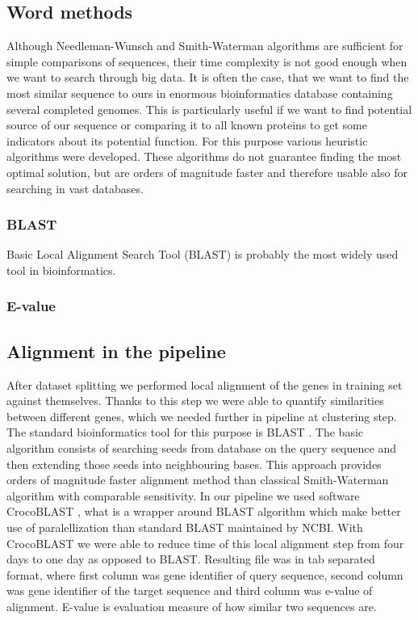 \subsection{Word methods}
Although Needleman-Wunsch and Smith-Waterman algorithms are sufficient for simple comparisons of sequences, their time complexity is not good enough when we want to search through big data.
It is often the case, that we want to find the most similar sequence to ours in enormous bioinformatics database containing several completed genomes.
This is particularly useful if we want to find potential source of our sequence or comparing it to all known proteins to get some indicators about its potential function.
For this purpose various heuristic algorithms were developed.
These algorithms do not guarantee finding the most optimal solution, but are orders of magnitude faster and therefore usable also for searching in vast databases.
  
\subsubsection{BLAST}
Basic Local Alignment Search Tool (BLAST) is probably the most widely used tool in bioinformatics.
 
\subsubsection{E-value}

\subsection{Alignment in the pipeline}
After dataset splitting we performed local alignment of the genes in training set against themselves.
Thanks to this step we were able to quantify similarities between different genes, which we needed further in pipeline at clustering step.
The standard bioinformatics tool for this purpose is BLAST \cite{blast}. 
The basic algorithm consists of searching seeds from database on the query sequence and then extending those seeds into neighbouring bases.
This approach provides orders of magnitude faster alignment method than classical Smith-Waterman algorithm \cite{smith_waterman} with comparable sensitivity.
In our pipeline we used software CrocoBLAST \cite{crocoblast}, what is a wrapper around BLAST algorithm which make better use of paralellization than standard BLAST maintained by NCBI.
With CrocoBLAST we were able to reduce time of this local alignment step from four days to one day as opposed to BLAST.
Resulting file was in tab separated format, where first column was gene identifier of query sequence, second column was gene identifier of the target sequence and third column was e-value of alignment. 
E-value is evaluation measure of how similar two sequences are.

